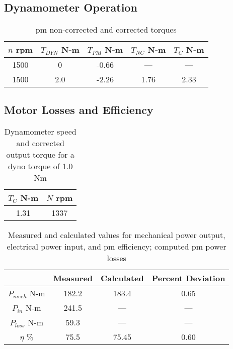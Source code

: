 \documentclass{article}
\begin{document}
\subsection{Dynamometer Operation}

\begin{table}[H]
  \centering
  \begin{tabular}{*{5}{c}}
    $n$ rpm & $T_{DYN}$ N-m& $T_{PM}$ N-m & $T_{NC}$ N-m & $T_C$ N-m \\
    \hline
    1500 &   0 & -0.66 &  --- &  --- \\
    1500 & 2.0 & -2.26 & 1.76 & 2.33 \\
  \end{tabular}
  \caption{\gls{pm} non-corrected and corrected torques}
  \label{tab:table_03}
\end{table}

\subsection{Motor Losses and Efficiency}

\begin{table}[H]
  \centering
  \begin{tabular}{*{2}{c}}
    $T_{C}$ N-m& $N$ rpm \\
    \hline
    1.31 & 1337  \\
  \end{tabular}
  \caption{Dynamometer speed and corrected output torque for a dyno torque of 1.0 Nm}
  \label{tab:table_04}
\end{table}

\begin{table}[H]
  \centering
  \begin{tabular}{*{4}{c}}
    & \textbf{Measured} & \textbf{Calculated} & \textbf{Percent Deviation} \\
    \hline
    $P_{mech}$ N-m & 182.2 & 183.4  & 0.65  \\
    $P_{in}$ N-m & 241.5 & --- & --- \\
    $P_{loss}$ N-m & 59.3 & --- & --- \\
    $\eta$ \% & 75.5 & 75.45 & 0.60 \\
  \end{tabular}
  \caption{Measured and calculated values for mechanical power output,
    electrical power input, and \gls{pm} efficiency; computed \gls{pm}
  power losses}
  \label{tab:table_05}
\end{table}
\end{document}
